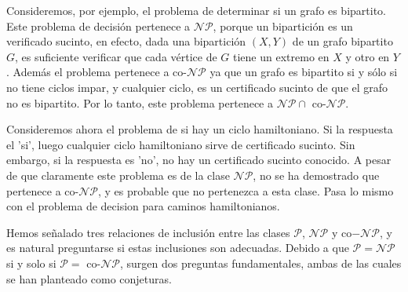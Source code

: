 \documentclass{article}
\begin{document}
Consideremos, por ejemplo, el problema de determinar
si un grafo es bipartito. Este problema de decisión pertenece
a $\mathcal{NP}$, porque un bipartición es un verificado
sucinto, en efecto, dada una bipartición $(X,Y)$ de un grafo
bipartito $G$, es suficiente verificar que cada vértice de $G$
tiene un extremo en $X$ y otro en $Y$. Además el problema pertenece
a co-$\mathcal{NP}$ ya que un grafo es bipartito si y sólo
si no tiene ciclos impar, y cualquier ciclo, es un certificado sucinto
de que el grafo no es bipartito. Por lo tanto, este problema 
pertenece a $\mathcal{NP} \cap$ co-$\mathcal{NP}$.

Consideremos ahora el problema de si hay un ciclo hamiltoniano.
Si la respuesta el 'si', luego cualquier ciclo hamiltoniano sirve
de certificado sucinto. Sin embargo, si la respuesta es 'no', no
hay un certificado sucinto conocido. A pesar de que claramente
este problema es de la clase $\mathcal{NP}$, no se ha demostrado
que pertenece a co-$\mathcal{NP}$, y es probable que no
pertenezca a esta clase. Pasa lo mismo con el problema de
decision para caminos hamiltonianos.

Hemos señalado tres relaciones de inclusión entre las clases
$\mathcal{P}$, $\mathcal{N}\mathcal{P}$ y
co$-\mathcal{N}\mathcal{P}$, y es natural preguntarse
si estas inclusiones son adecuadas. Debido a que
$\mathcal{P} = \mathcal{N}\mathcal{P}$
si y solo si $\mathcal{P} = $ co-$\mathcal{N}\mathcal{P}$,
surgen dos preguntas fundamentales, ambas de las cuales se han 
planteado como conjeturas. 

\setlength{\fboxsep}{10pt}
\noindent{}
\end{document}
